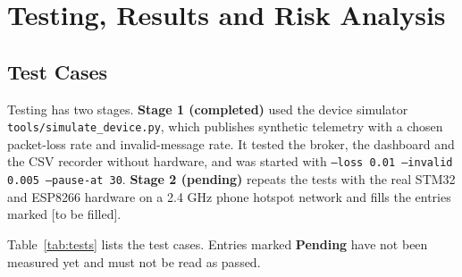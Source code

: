 \documentclass[12pt,a4paper]{report}
\begin{document}
\chapter{Testing, Results and Risk Analysis}
\label{ch:testing}
\section{Test Cases}
Testing has two stages. \textbf{Stage 1 (completed)} used the device simulator \texttt{tools/simulate\_device.py}, which publishes synthetic telemetry with a chosen packet-loss rate and invalid-message rate. It tested the broker, the dashboard and the CSV recorder without hardware, and was started with \texttt{--loss 0.01 --invalid 0.005 --pause-at 30}. \textbf{Stage 2 (pending)} repeats the tests with the real STM32 and ESP8266 hardware on a 2.4 GHz phone hotspot network and fills the entries marked [to be filled].

Table~\ref{tab:tests} lists the test cases. Entries marked \textbf{Pending} have not been measured yet and must not be read as passed.
\end{document}

